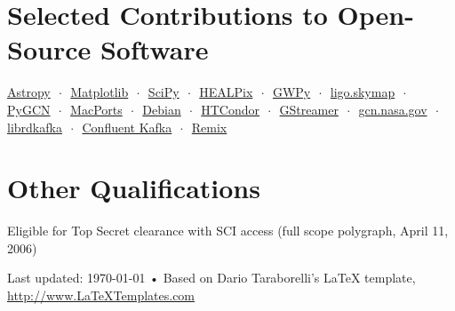 \documentclass[10pt, letterpaper]{article} %
\newcommand{\listsep}{$\,\cdot\,$}
\begin{document}

\section*{Selected Contributions to Open-Source Software}

\href{http://www.astropy.org}{Astropy} \listsep{} \href{http://matplotlib.org}{Matplotlib} \listsep{} \href{http://www.scipy.org}{SciPy} \listsep{} \href{http://healpix.jpl.nasa.gov}{HEALPix} \listsep{} \href{https://gwpy.github.io}{GWPy} \listsep{} \href{https://lscsoft.docs.ligo.org/ligo.skymap/}{ligo.skymap} \listsep{} \href{https://github.com/lpsinger/pygcn}{PyGCN} \listsep{} \href{http://www.macports.org/}{MacPorts} \listsep{} \href{https://www.debian.org}{Debian} \listsep{} \href{http://research.cs.wisc.edu/htcondor/}{HTCondor} \listsep{} \href{http://gstreamer.net}{GStreamer} \listsep{} \href{https://github.com/nasa-gcn/gcn.nasa.gov}{gcn.nasa.gov} \listsep{} \href{https://github.com/edenhill/librdkafka}{librdkafka} \listsep{} \href{https://github.com/confluentinc/confluent-kafka-python}{Confluent Kafka} \listsep{} \href{https://github.com/remix-run/remix}{Remix}

\section*{Other Qualifications}

Eligible for Top Secret clearance with SCI access (full scope polygraph, April 11, 2006)

%

\vfill{} %


\begin{center}
{\scriptsize Last updated: \today\- •\- Based on Dario Taraborelli's LaTeX template, \href{http://www.LaTeXTemplates.com}{http://www.LaTeXTemplates.com}} %
\end{center}

\end{document}
